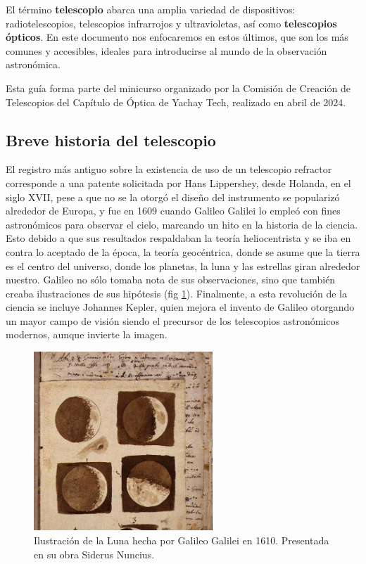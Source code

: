 El término \textbf{telescopio} abarca una amplia variedad de dispositivos: radiotelescopios, telescopios infrarrojos y ultravioletas, así como \textbf{telescopios ópticos}. En este documento nos enfocaremos en estos últimos, que son los más comunes y accesibles, ideales para introducirse al mundo de la observación astronómica.

Esta guía forma parte del minicurso organizado por la Comisión de Creación de Telescopios del Capítulo de Óptica de Yachay Tech, realizado en abril de 2024.

\subsection*{Breve historia del telescopio}

El registro más antiguo sobre la existencia de uso de un telescopio refractor corresponde a una patente solicitada por Hans Lippershey, desde Holanda, en el siglo XVII, pese a que no se la otorgó el diseño del instrumento se popularizó alrededor de Europa, y fue en 1609 cuando Galileo Galilei lo empleó con fines astronómicos para observar el cielo, marcando un hito en la historia de la ciencia. Esto debido a que sus resultados respaldaban la teoría heliocentrista y se iba en contra lo aceptado de la época, la teoría geocéntrica, donde se asume que la tierra es el centro del universo, donde los planetas, la luna y las estrellas giran alrededor nuestro. Galileo no sólo tomaba nota de sus observaciones, sino que también creaba ilustraciones de sus hipótesis (fig \ref{fig:ilustracion_luna_galileo_1610}). Finalmente, a esta revolución de la ciencia se incluye Johannes Kepler, quien mejora el invento de Galileo otorgando un mayor campo de visión siendo el precursor de los telescopios astronómicos modernos, aunque invierte la imagen. 

\begin{figure}[H]
	\centering
	\includegraphics[width=0.6\textwidth]{images/ilustracion_galileo.jpg}
	\caption{Ilustración de la Luna hecha por Galileo Galilei en 1610. Presentada en su obra Siderus Nuncius.}
	\label{fig:ilustracion_luna_galileo_1610}
\end{figure}

